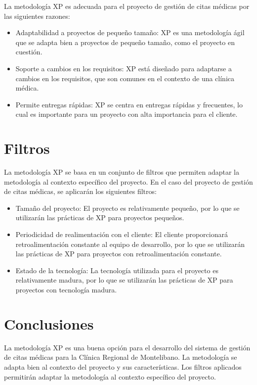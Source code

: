 \documentclass{article}
\theoremstyle{mytheoremstyle}
\theoremstyle{mytheoremstyle}
\theoremstyle{myproblemstyle}
\begin{document}
La metodología XP es adecuada para el proyecto de gestión de citas médicas por las siguientes razones:
\begin{itemize}
    \item Adaptabilidad a proyectos de pequeño tamaño: XP es una metodología ágil que se adapta bien a proyectos de pequeño tamaño, como el proyecto en cuestión.
    \item Soporte a cambios en los requisitos: XP está diseñado para adaptarse a cambios en los requisitos, que son comunes en el contexto de una clínica médica.
    \item Permite entregas rápidas: XP se centra en entregas rápidas y frecuentes, lo cual es importante para un proyecto con alta importancia para el cliente.
\end{itemize}



\section{Filtros}

La metodología XP se basa en un conjunto de filtros que permiten adaptar la metodología al contexto específico del proyecto. En el caso del proyecto de gestión de citas médicas, se aplicarán los siguientes filtros:
\begin{itemize}
    \item Tamaño del proyecto: El proyecto es relativamente pequeño, por lo que se utilizarán las prácticas de XP para proyectos pequeños.
    \item Periodicidad de realimentación con el cliente: El cliente proporcionará retroalimentación constante al equipo de desarrollo, por lo que se utilizarán las prácticas de XP para proyectos con retroalimentación constante.
    \item Estado de la tecnología: La tecnología utilizada para el proyecto es relativamente madura, por lo que se utilizarán las prácticas de XP para proyectos con tecnología madura.
\end{itemize}


\section{Conclusiones}

La metodología XP es una buena opción para el desarrollo del sistema de gestión de citas médicas para la Clínica Regional de Montelibano. La metodología se adapta bien al contexto del proyecto y sus características. Los filtros aplicados permitirán adaptar la metodología al contexto específico del proyecto.


\nocite{*}

\end{document}
